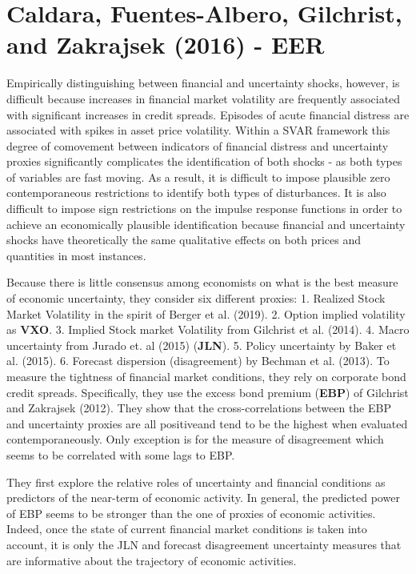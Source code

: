 \documentclass{article}
\begin{document}
{\section{Caldara, Fuentes-Albero, Gilchrist, and Zakrajsek (2016) - EER}

Empirically distinguishing between financial and uncertainty shocks, however, is difficult because increases in financial market volatility are frequently associated with significant increases in credit spreads. Episodes of acute financial distress are associated with spikes in asset price volatility. Within a SVAR framework this degree of comovement between indicators of financial distress and uncertainty proxies significantly complicates the identification of both shocks - as both types of variables are fast moving. As a result, it is difficult to impose plausible zero contemporaneous restrictions to identify both types of disturbances. It is also difficult to impose sign restrictions on the impulse response functions in order to achieve an economically plausible identification because financial and uncertainty shocks have theoretically the same qualitative effects on both prices and quantities in most instances.  


Because there is little consensus among economists on what is the best measure of economic uncertainty, they consider six different proxies: 1. Realized Stock Market Volatility in the spirit of Berger et al. (2019). 2. Option implied volatility as \textbf{VXO}. 3. Implied Stock market Volatility from Gilchrist et al. (2014). 4. Macro uncertainty from Jurado et. al (2015) (\textbf{JLN}). 5. Policy uncertainty by Baker et al. (2015). 6. Forecast dispersion (disagreement) by Bechman et al. (2013). To measure the tightness of financial market conditions, they rely on corporate bond credit spreads. Specifically, they use the excess bond premium (\textbf{EBP}) of Gilchrist and Zakrajsek (2012). They show that the cross-correlations between the EBP and uncertainty proxies are all positiveand tend to be the highest when evaluated contemporaneously. Only exception is for the measure of disagreement which seems to be correlated with some lags to EBP. 

They first explore the relative roles of uncertainty and financial conditions as predictors of the near-term of economic activity. In general, the predicted power of EBP seems to be stronger than the one of proxies of economic activities. Indeed, once the state of current financial market conditions is taken into account, it is only the JLN and forecast disagreement uncertainty measures that are informative about the trajectory of economic activities. 

}
\end{document}
